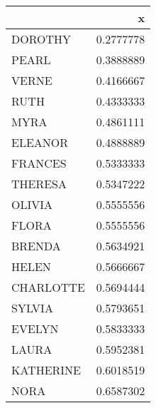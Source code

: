 
\begin{tabular}[t]{l|r}
\hline
  & x\\
\hline
DOROTHY & 0.2777778\\
\hline
PEARL & 0.3888889\\
\hline
VERNE & 0.4166667\\
\hline
RUTH & 0.4333333\\
\hline
MYRA & 0.4861111\\
\hline
ELEANOR & 0.4888889\\
\hline
FRANCES & 0.5333333\\
\hline
THERESA & 0.5347222\\
\hline
OLIVIA & 0.5555556\\
\hline
FLORA & 0.5555556\\
\hline
BRENDA & 0.5634921\\
\hline
HELEN & 0.5666667\\
\hline
CHARLOTTE & 0.5694444\\
\hline
SYLVIA & 0.5793651\\
\hline
EVELYN & 0.5833333\\
\hline
LAURA & 0.5952381\\
\hline
KATHERINE & 0.6018519\\
\hline
NORA & 0.6587302\\
\hline
\end{tabular}
